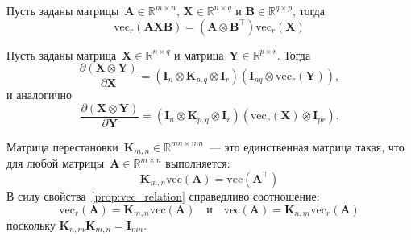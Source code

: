 \begin{property}\label{prop:vec_r_matrix_product}
    Пусть заданы матрицы~$\mathbf{A} \in \mathbb{R}^{m \times n}$, $\mathbf{X} \in \mathbb{R}^{n \times q}$ и $\mathbf{B} \in \mathbb{R}^{q \times p}$, тогда
    \begin{equation}
        \mathrm{vec}_r(\mathbf{A} \mathbf{X}\mathbf{B}) = (\mathbf{A} \otimes \mathbf{B}^\top) \mathrm{vec}_r(\mathbf{X})
    \end{equation}
\end{property}

\begin{property}\label{prop:kronecker_product_derivative}
    Пусть заданы матрица~$\mathbf{X} \in \mathbb{R}^{n \times q}$ и матрица~$ \mathbf{Y} \in \mathbb{R}^{p \times r}$. Тогда
    \begin{equation}
        \frac{\partial (\mathbf{X} \otimes \mathbf{Y})}{\partial \mathbf{X}} = (\mathbf{I}_n \otimes \mathbf{K}_{p,q} \otimes \mathbf{I}_r) \left( \mathbf{I}_{nq} \otimes \mathrm{vec}_r(\mathbf{Y}) \right),
    \end{equation}
    и аналогично
    \begin{equation}
        \frac{\partial (\mathbf{X} \otimes \mathbf{Y})}{\partial \mathbf{Y}} = (\mathbf{I}_n \otimes \mathbf{K}_{p,q} \otimes \mathbf{I}_r) \left( \mathrm{vec}_r(\mathbf{X}) \otimes \mathbf{I}_{pr} \right).
    \end{equation}
\end{property}

\begin{definition}\label{def:commutation_matrix}
    Матрица перестановки~$\mathbf{K}_{m,n} \in \mathbb{R}^{mn \times mn}$~--- это единственная матрица такая, что для любой матрицы~$\mathbf{A} \in \mathbb{R}^{m \times n}$ выполняется:
    \begin{equation}
        \mathbf{K}_{m,n} \mathrm{vec}(\mathbf{A}) = \mathrm{vec}(\mathbf{A}^\top)
    \end{equation}
    В силу свойства~\ref{prop:vec_relation} справедливо соотношение:
    \begin{equation}
        \mathrm{vec}_r(\mathbf{A}) = \mathbf{K}_{m,n} \mathrm{vec}(\mathbf{A}) \quad \text{и} \quad \mathrm{vec}(\mathbf{A}) = \mathbf{K}_{n,m} \mathrm{vec}_r(\mathbf{A})
    \end{equation}
    поскольку $\mathbf{K}_{n,m}\mathbf{K}_{m,n} = \mathbf{I}_{mn}$.
\end{definition}

